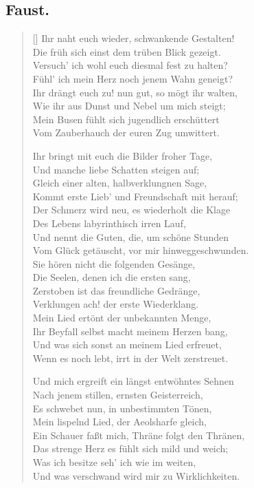\documentclass[10pt, twoside]{lecturenotes}
\begin{document}
\begin{german}

\section*{Faust.}
\renewcommand{\poemtoc}{section}
\settowidth{\versewidth}{Ihr naht euch wieder, schwankende Gestalten!}
\begin{verse}[\versewidth]
Ihr naht euch wieder, schwankende Gestalten!\\
Die früh sich einst dem trüben Blick gezeigt.\\
Versuch’ ich wohl euch diesmal fest zu halten?\\
Fühl’ ich mein Herz noch jenem Wahn geneigt?\\
Ihr drängt euch zu! nun gut, so mögt ihr walten,\\
Wie ihr aus Dunst und Nebel um mich steigt;\\
Mein Busen fühlt sich jugendlich erschüttert\\
Vom Zauberhauch der euren Zug umwittert.

Ihr bringt mit euch die Bilder froher Tage,\\
Und manche liebe Schatten steigen auf;\\
Gleich einer alten, halbverklungnen Sage,\\
Kommt erste Lieb’ und Freundschaft mit herauf;\\
Der Schmerz wird neu, es wiederholt die Klage\\
Des Lebens labyrinthisch irren Lauf,\\
Und nennt die Guten, die, um schöne Stunden\\
Vom Glück getäuscht, vor mir hinweggeschwunden.\\
Sie hören nicht die folgenden Gesänge,\\
Die Seelen, denen ich die ersten sang,\\
Zerstoben ist das freundliche Gedränge,\\
Verklungen ach! der erste Wiederklang.\\
Mein Lied ertönt der unbekannten Menge,\\
Ihr Beyfall selbst macht meinem Herzen bang,\\
Und was sich sonst an meinem Lied erfreuet,\\
Wenn es noch lebt, irrt in der Welt zerstreuet.

Und mich ergreift ein längst entwöhntes Sehnen\\
Nach jenem stillen, ernsten Geisterreich,\\
Es schwebet nun, in unbestimmten Tönen,\\
Mein lispelnd Lied, der Aeolsharfe gleich,\\
Ein Schauer faßt mich, Thräne folgt den Thränen,\\
Das strenge Herz es fühlt sich mild und weich;\\
Was ich besitze seh’ ich wie im weiten,\\
Und was verschwand wird mir zu Wirklichkeiten.
\end{verse}
\end{german}
\end{document}
